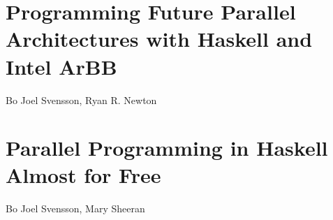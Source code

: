 \documentclass[a4paper]{book}
\newcommand{\paperARBB}{Programming Future Parallel Architectures with Haskell and Intel ArBB}
\newcommand{\paperEMBARBB}{Parallel Programming in Haskell Almost for Free}
\begin{document}
\section{\paperARBB}
\label{sec:paperARBB}

\begin{center} 
Bo Joel Svensson, Ryan R. Newton
\end{center}




% 
\cleardoublepage 


\section{\paperEMBARBB}
\label{sec:paperEMBARBB}

\begin{center} 
Bo Joel Svensson, Mary Sheeran
\end{center}





\cleardoublepage


\nocite{*}



\makeatletter
\renewenvironment{thebibliography}[1]
     {\chapter*{\bibname}%
      \@mkboth{\MakeUppercase\bibname}{\MakeUppercase\bibname}%
      \list{\@biblabel{\@arabic\c@enumiv}}%
           {\settowidth\labelwidth{\@biblabel{#1}}%
            \leftmargin\labelwidth
            \advance\leftmargin\labelsep
            \@openbib@code
            \usecounter{enumiv}%
            \let\p@enumiv\@empty
            \renewcommand\theenumiv{\@arabic\c@enumiv}}%
      \sloppy
      \clubpenalty4000
      \@clubpenalty \clubpenalty
      \widowpenalty4000%
      \sfcode`\.\@m}
     {\def\@noitemerr
       {\@latex@warning{Empty `thebibliography' environment}}%
       \endlist}
\makeatother



\end{document}
